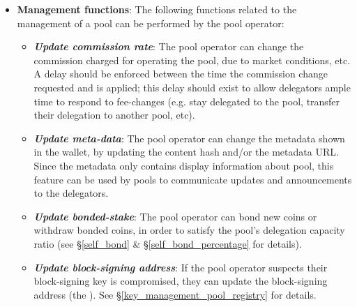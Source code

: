 \begin{itemize}
    \item \textbf{Management functions}:
    The following functions related to the management of a pool can be performed by the pool operator:
    \begin{itemize}
        \item \textbf{\textit{Update commission rate}}: The pool operator can change the commission charged for operating the pool, due to market conditions, etc. A delay should be enforced between the time the commission change requested and is applied; this delay should exist to allow delegators ample time to respond to fee-changes (e.g. stay delegated to the pool, transfer their delegation to another pool, etc).
        \item \textbf{\textit{Update meta-data}}: The pool operator can change the metadata shown in the wallet, by updating the content hash and/or the metadata URL. Since the metadata only contains display information about pool, this feature can be used by pools to communicate updates and announcements to the delegators. 
        \item \textbf{\textit{Update bonded-stake}}: The pool operator can bond new coins or withdraw bonded coins, in order to satisfy the pool's delegation capacity ratio (see \S\ref{self_bond} \& \S\ref{self_bond_percentage} for details). 
        \item \textbf{\textit{Update block-signing address}}: If the pool operator suspects their block-signing key is compromised, they can update the block-signing address (the ). See \S\ref{key_management_pool_registry} for details. 
    \end{itemize}
\end{itemize}

\clearpage
